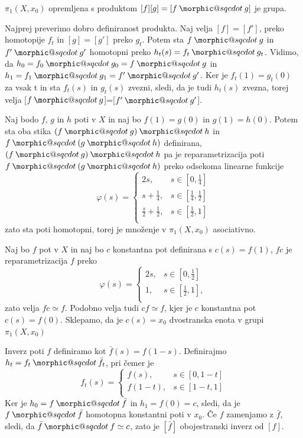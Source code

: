 \documentclass[mat1]{fmfdelo}
\makeatletter
\DeclareRobustCommand{\sqcdot}{\mathbin{\mathpalette\morphic@sqcdot\relax}}
\newcommand{\morphic@sqcdot}[2]{%
\sbox\z@{$\m@th#1\centerdot$}%
\ht\z@=.33333\ht\z@
\vcenter{\box\z@}%
}
\makeatother
\begin{document}
\begin{izrek}
    $\pi_1(X,x_0)$ opremljena s produktom $[f][g] = [f\sqcdot g]$ je grupa.
\end{izrek}

\begin{dokaz}
    Najprej preverimo dobro definiranost produkta. Naj velja $[f]=[f']$, preko homotopije $f_t$ in $[g]=[g']$ preko $g_t$. Potem sta $f\sqcdot g$ in $f'\sqcdot g'$ homotopni preko
    $h_t(s) =f_t \sqcdot g_t$. Vidimo, da $h_0=f_0 \sqcdot g_0=f \sqcdot g$ in $h_1=f_1 \sqcdot g_1=f'\sqcdot g'$. Ker je $f_t(1)=g_t(0)$ za vsak t in sta $f_t(s)$ in $g_t(s)$ zvezni, sledi, da je tudi $h_t(s)$ zvezna, torej velja [$f\sqcdot g$]=[$f'\sqcdot g'$].

    Naj bodo $f$, $g$ in $h$ poti v $X$ in naj bo $f(1)=g(0)$ in 
    $g(1)=h(0)$. Potem sta oba stika $(f\sqcdot g) \sqcdot h$ in 
    $f\sqcdot (g \sqcdot h)$ definirana, $(f\sqcdot g) \sqcdot h$ pa je
     reparametrizacija poti $f\sqcdot (g \sqcdot h)$ preko odsekoma linearne 
     funkcije
    $$
    \varphi(s)=\begin{cases}
        2s, & s \in [0,\frac{1}{4}]\\
        s+\frac{1}{4}, & s \in [\frac{1}{4},\frac{1}{2}]\\
        \frac{s}{2}+\frac{1}{2}, &s \in [\frac{1}{2},1] \\
    \end{cases}
    $$ zato sta poti homotopni, torej je množenje v $\pi_1(X,x_0)$ asociativno.

    Naj bo $f$ pot v $X$ in naj bo $c$ konstantna pot definirana s $c(s)=f(1)$, $fc$ je reparametrizacija $f$ preko 
    $$\varphi(s)=\begin{cases}
        2s, &s \in [0,\frac{1}{2}] \\
        1, & s \in [\frac{1}{2},1],\\
        \end{cases}
    $$zato velja $fc\simeq f$. Podobno velja tudi  $cf\simeq f$, kjer je $c$ konstantna pot $c(s)=f(0)$. Sklepamo, da je $c(s)=x_0$ dvostranska enota v grupi  $\pi_1(X,x_0)$

    Inverz poti $f$ definiramo kot $\bar{f}(s)=f(1-s)$. Definirajmo $h_t=f_t\sqcdot \bar{f_t}$, pri čemer je 
    $$
    f_t(s)=
    \begin{cases}
        f(s), &s \in [0,1-t] \\
        f(1-t), & s \in [1-t,1] \\
        \end{cases}
$$
Ker je $h_0=f\sqcdot \bar{f}$ in $h_1=f(0)=c$, sledi, da je $f\sqcdot \bar{f}$ homotopna konstantni poti v $x_0$. Če $f$ zamenjamo z $\bar{f}$, sledi, da $\bar{f}\sqcdot f\simeq c$, zato je $[\bar{f}]$ obojestranski inverz od $[f]$.
\end{dokaz}
\end{document}
